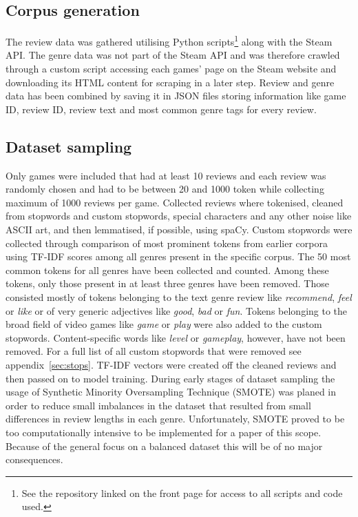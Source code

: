 \documentclass[11pt, a4paper]{article}
\begin{document}

\subsection{Corpus generation}\label{subsec:corpus-generation}
The review data was gathered utilising Python scripts\footnote{See the repository linked on the front page for access
to all scripts and code used.} along with the Steam API. The genre data
was not part of the Steam API and was therefore crawled through a custom script accessing each games' page on the Steam
website and downloading its HTML content for scraping in a later step.
Review and genre data has been combined by saving it in JSON files storing information like game ID, review ID,
review text and most common genre tags for every review.

\subsection{Dataset sampling}
Only games were included that had at least 10 reviews and each review was randomly chosen and had to be between 20 and
1000 token while collecting maximum of 1000 reviews per game.
Collected reviews where tokenised, cleaned from stopwords and custom stopwords, special characters and any other
noise like ASCII art, and then lemmatised, if possible, using spaCy.
Custom stopwords were collected through comparison of most prominent tokens from earlier corpora using TF-IDF scores
among all genres present in the specific corpus.
The 50 most common tokens for all genres have been collected and counted.
Among these tokens, only those present in at least three genres have been removed.
Those consisted mostly of tokens belonging to the text genre review like \textit{recommend}, \textit{feel} or
\textit{like} or of very generic adjectives like \textit{good}, \textit{bad} or \textit{fun}.
Tokens belonging to the broad field of video games like \textit{game} or \textit{play} were also added to the custom
stopwords.
Content-specific words like \textit{level} or \textit{gameplay}, however, have not been removed.
For a full list of all custom stopwords that were removed see appendix~\ref{sec:stops}.
TF-IDF vectors were created off the cleaned reviews and then passed on to model training.
During early stages of dataset sampling the usage of Synthetic Minority Oversampling Technique (SMOTE) was
planed in order to reduce small imbalances in the dataset that resulted from small differences in review lengths in
each genre.
Unfortunately, SMOTE proved to be too computationally intensive to be implemented for a paper of this scope.
Because of the general focus on a balanced dataset this will be of no major consequences.
\end{document}
